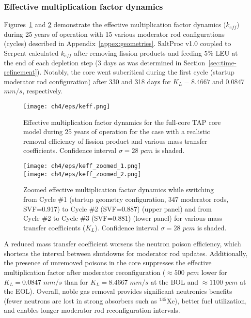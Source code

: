 \subsubsection{Effective multiplication factor dynamics}
Figures~\ref{fig:keff-eps-var} and \ref{fig:keff-eps-var-zoom} demonstrate the 
effective multiplication factor dynamics ($k_{eff}$) 
during 25 years of operation with 15 various moderator rod configurations 
(cycles) described in Appendix~\ref{appex:geometries}. SaltProc v1.0 
coupled to Serpent calculated 
$k_{eff}$ after removing fission products and feeding 5\% \gls{LEU} at the end 
of each depletion step (3 days as was determined in 
Section~\ref{sec:time-refinement}). Notably, the core went subcritical during 
the first cycle (startup moderator rod configuration) after 330 and 318 days 
for $K_L=8.4667$ and 0.0847 $mm/s$, respectively. 
\begin{figure}[htp!] %
	\centering
	\texttt{[image: ch4/eps/keff.png]}
	\caption{Effective multiplication factor dynamics for the full-core 
		\gls{TAP} core model during 25 years of operation for the case with a 
		realistic removal efficiency of fission product and various mass 
		transfer 
		coefficients. Confidence interval $\sigma=28$ $pcm$ is shaded.}
	\label{fig:keff-eps-var}
\end{figure}
\begin{figure}[htbp!] %
	\centering
	\texttt{[image: ch4/eps/keff\_zoomed\_1.png]}\\
	\vspace{-8mm}
	\hspace{+1mm}
	\texttt{[image: ch4/eps/keff\_zoomed\_2.png]}
	\vspace{-3mm}
	\caption{Zoomed effective multiplication factor dynamics while switching
		from Cycle \#1 (startup geometry configuration, 347 moderator rods, 
		\gls{SVF}=0.917) to Cycle \#2 (\gls{SVF}=0.887) (upper panel) and
		from Cycle \#2 to  Cycle \#3 (\gls{SVF}=0.881) 
		(lower panel) for various mass transfer coefficients ($K_L$). 
		Confidence interval $\sigma=28$ $pcm$ is shaded.}
	\label{fig:keff-eps-var-zoom}
\end{figure}

A reduced mass transfer coefficient worsens the neutron poison efficiency, 
which shortens the interval between 
shutdowns for moderator rod updates. Additionally, the presence of unremoved 
poisons in the core suppresses the effective multiplication factor after 
moderator reconfiguration ($\approx500$ $pcm$ lower for $K_L=0.0847$ $mm/s$ 
than for $K_L=8.4667$ $mm/s$ at the \gls{BOL} and $\approx1100$ $pcm$ at 
the \gls{EOL}). Overall, noble gas removal provides significant neutronics 
benefits (fewer neutrons are lost in strong absorbers such as 
$^{135}$Xe), better fuel utilization, and enables longer moderator rod 
reconfiguration intervals.

